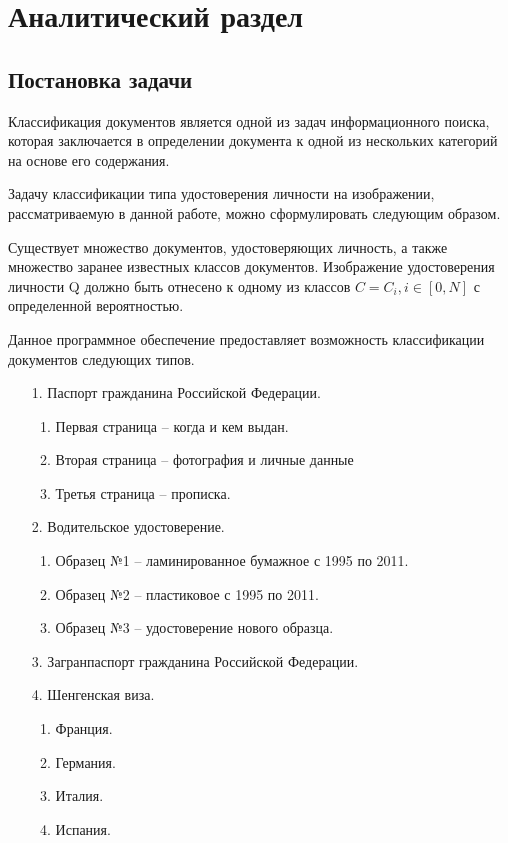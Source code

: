 \chapter{\textbf{Аналитический раздел}}

\section{Постановка задачи}

Классификация документов является одной из задач информационного поиска, которая заключается в определении документа к одной из нескольких категорий на основе его содержания.

Задачу классификации типа удостоверения личности на изображении, рассматриваемую в данной работе, можно сформулировать следующим образом.

Существует множество документов, удостоверяющих личность, а также множество заранее известных классов документов. Изображение удостоверения личности Q должно быть отнесено к одному из классов $C=C_i, i \in [0, N]$ с определенной вероятностью.

Данное программное обеспечение предоставляет возможность классификации документов следующих типов. 
\begin{enumerate}
\item[1.] Паспорт гражданина Российской Федерации.
\begin{enumerate}
\item Первая страница -- когда и кем выдан.
\item Вторая страница -- фотография и личные данные
\item Третья страница -- прописка.
\end{enumerate}
\item[2.] Водительское удостоверение.
\begin{enumerate}
\item Образец №1 -- ламинированное бумажное с 1995 по 2011.
\item Образец №2 -- пластиковое с 1995 по 2011.
\item Образец №3 -- удостоверение нового образца.
\end{enumerate}
\item[3.] Загранпаспорт гражданина Российской Федерации.
\item[4.] Шенгенская виза.
\begin{enumerate}
\item Франция.
\item Германия.
\item Италия.
\item Испания.
\end{enumerate}
\end{enumerate}


